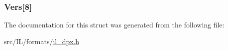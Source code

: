 \hypertarget{struct_d_p_x___f_i_l_e___i_n_f_o_a04d9ebf7d3ed9560d2dca451a894f02d}{
\subsubsection[{Vers}]{ Vers\mbox{[}8\mbox{]}}}\label{struct_d_p_x___f_i_l_e___i_n_f_o_a04d9ebf7d3ed9560d2dca451a894f02d}


The documentation for this struct was generated from the following file\-:\begin{DoxyCompactItemize}
\item 
src/\-I\-L/formats/\hyperlink{il__dpx_8h}{il\-\_\-dpx.\-h}\end{DoxyCompactItemize}
